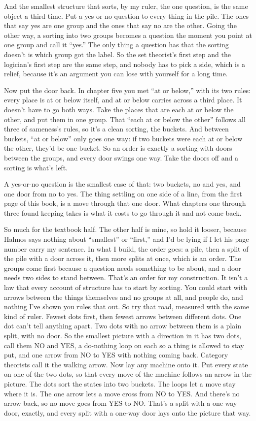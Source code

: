 \documentclass[11pt,twoside]{article}
\theoremstyle{thielethm}
\theoremstyle{thieledef}
\theoremstyle{thieledef}
\theoremstyle{thieledef}
\theoremstyle{thielethm}
\theoremstyle{thieleobs}
\theoremstyle{thielethm}
\begin{document}
And the smallest structure that sorts, by my ruler, the one question, is the same object a third time. Put a yes-or-no question to every thing in the pile. The ones that say yes are one group and the ones that say no are the other. Going the other way, a sorting into two groups becomes a question the moment you point at one group and call it ``yes.'' The only thing a question has that the sorting doesn't is which group got the label. So the set theorist's first step and the logician's first step are the same step, and nobody has to pick a side, which is a relief, because it's an argument you can lose with yourself for a long time.

Now put the door back. In chapter five you met ``at or below,'' with its two rules: every place is at or below itself, and at or below carries across a third place. It doesn't have to go both ways. Take the places that are each at or below the other, and put them in one group. That ``each at or below the other'' follows all three of sameness's rules, so it's a clean sorting, the buckets. And between buckets, ``at or below'' only goes one way: if two buckets were each at or below the other, they'd be one bucket. So an order is exactly a sorting with doors between the groups, and every door swings one way. Take the doors off and a sorting is what's left.

A yes-or-no question is the smallest case of that: two buckets, no and yes, and one door from no to yes. The thing settling on one side of a line, from the first page of this book, is a move through that one door. What chapters one through three found keeping takes is what it costs to go through it and not come back.

So much for the textbook half. The other half is mine, so hold it looser, because Halmos says nothing about ``smallest'' or ``first,'' and I'd be lying if I let his page number carry my sentence. In what I build, the order goes: a pile, then a split of the pile with a door across it, then more splits at once, which is an order. The groups come first because a question needs something to be about, and a door needs two sides to stand between. That's an order for my construction. It isn't a law that every account of structure has to start by sorting. You could start with arrows between the things themselves and no groups at all, and people do, and nothing I've shown you rules that out. So try that road, measured with the same kind of ruler. Fewest dots first, then fewest arrows between different dots. One dot can't tell anything apart. Two dots with no arrow between them is a plain split, with no door. So the smallest picture with a direction in it has two dots, call them NO and YES, a do-nothing loop on each so a thing is allowed to stay put, and one arrow from NO to YES with nothing coming back. Category theorists call it the walking arrow. Now lay any machine onto it. Put every state on one of the two dots, so that every move of the machine follows an arrow in the picture. The dots sort the states into two buckets. The loops let a move stay where it is. The one arrow lets a move cross from NO to YES. And there's no arrow back, so no move goes from YES to NO. That's a split with a one-way door, exactly, and every split with a one-way door lays onto the picture that way.
\end{document}
